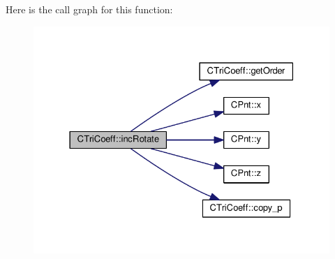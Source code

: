 Here is the call graph for this function\-:\nopagebreak
\begin{figure}[H]
\begin{center}
\leavevmode
\includegraphics[width=328pt]{classCTriCoeff_a2c13fdad1377155cfa7123f8bd04a634_cgraph}
\end{center}
\end{figure}


